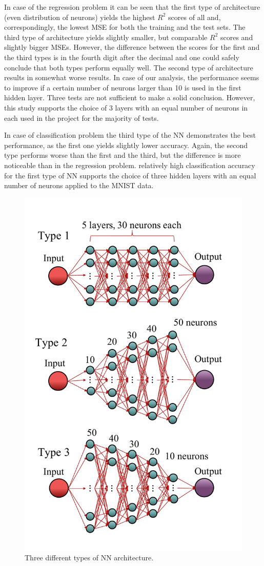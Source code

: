 \documentclass{emulateapj}
\begin{document}
In case of the regression problem it can be seen that the first type of architecture (even distribution of neurons) yields the highest $R^2$ scores of all and, correspondingly, the lowest MSE for both the training and the test sets. The third type of architecture yields slightly smaller, but comparable $R^2$ scores and slightly bigger MSEs. However, the difference between the scores for the first and the third types is in the fourth digit after the decimal and one could safely conclude that both types perform equally well. The second type of architecture results in somewhat worse results. In case of our analysis, the performance seems to improve if a certain number of neurons larger than 10 is used in the first hidden layer. Three tests are not sufficient to make a solid conclusion. However, this study supports the choice of 3 layers with an equal number of neurons in each used in the project for the majority of tests.

In case of classification problem the third type of the NN demonstrates the best performance, as the first one yields slightly lower accuracy. Again, the second type performs worse than the first and the third, but the difference is more noticeable than in the regression problem. relatively high classification accuracy for the first type of NN supports the choice of three hidden layers with an equal number of neurons applied to the MNIST data.

\begin{figure}[!htb]
    \centering
    \includegraphics[width=.39\textwidth]{Figures/architectures.pdf}
    \caption{Three different types of NN architecture.}
    \label{fig:architectures}
\end{figure}
\end{document}
